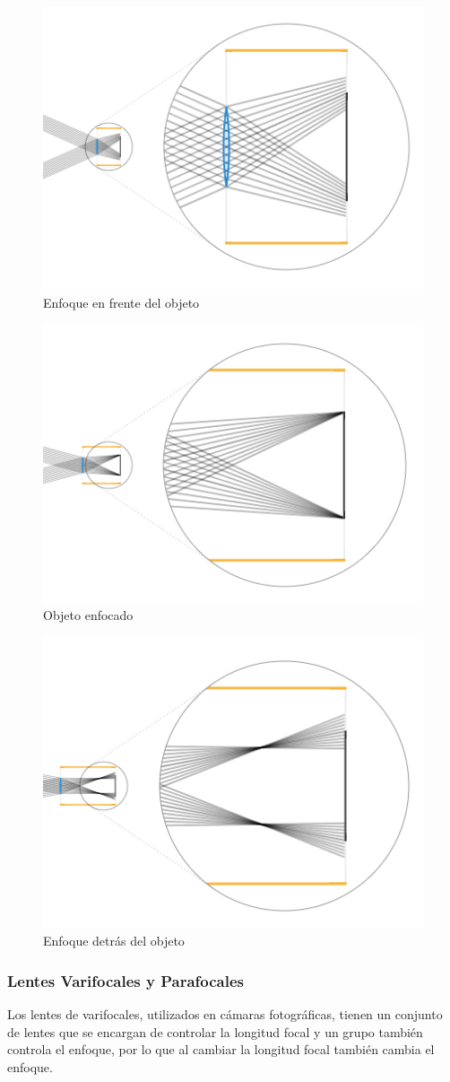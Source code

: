 \documentclass{article}
\begin{document}
\begin{figure}[H]
	\centering
	\includegraphics[width=0.45\linewidth]{Figuras/Enfoque_1}
	\caption{Enfoque en frente del objeto}
	\label{fig:enfoque1}
\end{figure}

\begin{figure}[H]
	\centering
	\includegraphics[width=0.45\linewidth]{Figuras/Enfoque_2}
	\caption{Objeto enfocado}
	\label{fig:enfoque2}
\end{figure}

\begin{figure}[H]
	\centering
	\includegraphics[width=0.45\linewidth]{Figuras/Enfoque_3}
	\caption{Enfoque detrás del objeto}
	\label{fig:enfoque3}
\end{figure}

\subsubsection{Lentes Varifocales y Parafocales}

Los lentes de varifocales, utilizados en cámaras fotográficas, tienen un conjunto de lentes que se encargan de controlar la longitud focal y un grupo también controla el enfoque, por lo que al cambiar la longitud focal también cambia el enfoque.
\end{document}
